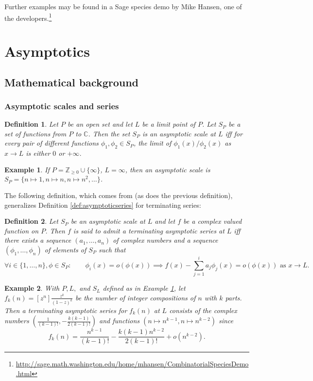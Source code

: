 \documentclass[12pt]{article}
\theoremstyle{plain}
\newtheorem{defin}{Definition}
\newtheorem{exa}{Example}
\begin{document}
Further examples may be found in a Sage species demo by Mike Hansen, one of the developers.\footnote{
 \url{http://sage.math.washington.edu/home/mhansen/CombinatorialSpeciesDemo.html}
}



\section{Asymptotics}
\label{sec:asymptotics}
\subsection{Mathematical background}
\subsubsection{Asymptotic scales and series}

\begin{defin}
Let \( P \) be an open set and let \( L \) be a limit point of \( P \).
Let \(S_P\) be a set of functions from \( P \) to \( \mathbb{C} \).
Then the set \(S_P \) is an \emph{asymptotic scale} at \(L \) iff for every pair of different functions \( \phi_1, \phi_2 \in S_P \), the limit of \( \phi_1(x)/\phi_2(x) \) as \(x \rightarrow L\) is either \(0\) or \(+\infty\).
\end{defin}

\begin{exa}
\label{exa:polys}
If \( P = \mathbb{Z}_{\geq0} \cup \{ \infty \} \), \(L = \infty \), then an asymptotic scale is \( S_P= \{n \mapsto 1, n \mapsto n, n \mapsto n^2,\dots \} \).
\end{exa}

The following definition, which comes from \cite{gdevexamples} (as does the previous definition), generalizes Definition \ref{def:asymptoticseries} for terminating series:
\begin{defin}
Let \(S_P\) be an asymptotic scale at \(L\) and let \(f\) be a complex valued function on \( P \).
Then \(f\) is said to admit a \emph{terminating asymptotic series} at \(L\) iff there exists a sequence \( (a_1, \dots, a_n) \) of complex numbers and a sequence \( (\phi_1, \dots, \phi_n) \) of elements of \(S_P\) such that
\[ \forall { i \in \{1,\dots, n \}, \phi \in S_P}: \qquad \phi_i(x) = o(\phi(x)) \implies f(x) - \sum_{j=1}^{i} a_j \phi_j(x) = o(\phi(x)) \text{ as } x \rightarrow L.\]
\end{defin}

\begin{exa}
With \(P, L,\) and \(S_L\) defined as in Example \ref{exa:polys}, let \(f_k(n) = [z^n] \frac{z^k}{(1-z)^k}\) be the number of integer compositions of \(n\) with \(k\) parts.
Then a terminating asymptotic series for \(f_k(n)\) at \(L\) consists of the complex numbers \( \left( \frac{1}{(k-1)!}, -\frac{k(k-1)}{2(k-1)!} \right) \) and functions \( ( n \mapsto n^{k-1}, n \mapsto n^{k-2}) \) since
\[ f_k(n) = \frac{n^{k-1}}{(k-1)!} - \frac{k(k-1) n^{k-2}}{2 (k-1)!}  + o(n^{k-2}). \]
\end{exa}
\end{document}
